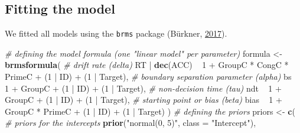 \documentclass[
  11pt,
  english,
  ,doc,floatsintext]{apa6}
\newenvironment{Shaded}{}{}
\newcommand{\CommentTok}[1]{\textcolor[rgb]{0.38,0.63,0.69}{\textit{#1}}}
\newcommand{\DataTypeTok}[1]{\textcolor[rgb]{0.56,0.13,0.00}{#1}}
\newcommand{\DecValTok}[1]{\textcolor[rgb]{0.25,0.63,0.44}{#1}}
\newcommand{\KeywordTok}[1]{\textcolor[rgb]{0.00,0.44,0.13}{\textbf{#1}}}
\newcommand{\NormalTok}[1]{#1}
\newcommand{\OperatorTok}[1]{\textcolor[rgb]{0.40,0.40,0.40}{#1}}
\newcommand{\StringTok}[1]{\textcolor[rgb]{0.25,0.44,0.63}{#1}}
\begin{document}
\hypertarget{fitting-the-model}{%
\subsection{Fitting the model}\label{fitting-the-model}}

We fitted all models using the \texttt{brms} package (Bürkner, \protect\hyperlink{ref-R-brms_a}{2017}).

\begin{Shaded}
\begin{Highlighting}[]
\CommentTok{# defining the model formula (one "linear model" per parameter)}
\NormalTok{formula <-}\StringTok{ }\KeywordTok{brmsformula}\NormalTok{(}
  \CommentTok{# drift rate (delta)}
\NormalTok{  RT }\OperatorTok{|}\StringTok{ }\KeywordTok{dec}\NormalTok{(ACC) }\OperatorTok{~}\StringTok{ }\DecValTok{1} \OperatorTok{+}\StringTok{ }\NormalTok{GroupC }\OperatorTok{*}\StringTok{ }\NormalTok{CongC }\OperatorTok{*}\StringTok{ }\NormalTok{PrimeC }\OperatorTok{+}\StringTok{ }\NormalTok{(}\DecValTok{1} \OperatorTok{|}\StringTok{ }\NormalTok{ID) }\OperatorTok{+}\StringTok{ }\NormalTok{(}\DecValTok{1} \OperatorTok{|}\StringTok{ }\NormalTok{Target),}
  \CommentTok{# boundary separation parameter (alpha)}
\NormalTok{  bs }\OperatorTok{~}\StringTok{ }\DecValTok{1} \OperatorTok{+}\StringTok{ }\NormalTok{GroupC }\OperatorTok{+}\StringTok{ }\NormalTok{(}\DecValTok{1} \OperatorTok{|}\StringTok{ }\NormalTok{ID) }\OperatorTok{+}\StringTok{ }\NormalTok{(}\DecValTok{1} \OperatorTok{|}\StringTok{ }\NormalTok{Target),}
  \CommentTok{# non-decision time (tau)}
\NormalTok{  ndt }\OperatorTok{~}\StringTok{ }\DecValTok{1} \OperatorTok{+}\StringTok{ }\NormalTok{GroupC }\OperatorTok{+}\StringTok{ }\NormalTok{(}\DecValTok{1} \OperatorTok{|}\StringTok{ }\NormalTok{ID) }\OperatorTok{+}\StringTok{ }\NormalTok{(}\DecValTok{1} \OperatorTok{|}\StringTok{ }\NormalTok{Target),}
  \CommentTok{# starting point or bias (beta)}
\NormalTok{  bias }\OperatorTok{~}\StringTok{ }\DecValTok{1} \OperatorTok{+}\StringTok{ }\NormalTok{GroupC }\OperatorTok{*}\StringTok{ }\NormalTok{PrimeC }\OperatorTok{+}\StringTok{ }\NormalTok{(}\DecValTok{1} \OperatorTok{|}\StringTok{ }\NormalTok{ID) }\OperatorTok{+}\StringTok{ }\NormalTok{(}\DecValTok{1} \OperatorTok{|}\StringTok{ }\NormalTok{Target)}
\NormalTok{  )}
\CommentTok{# defining the priors}
\NormalTok{priors <-}\StringTok{ }\KeywordTok{c}\NormalTok{(}
  \CommentTok{# priors for the intercepts}
  \KeywordTok{prior}\NormalTok{(}\StringTok{"normal(0, 5)"}\NormalTok{, }\DataTypeTok{class =} \StringTok{"Intercept"}\NormalTok{),}

\end{Highlighting}
\end{Shaded}
\end{document}
